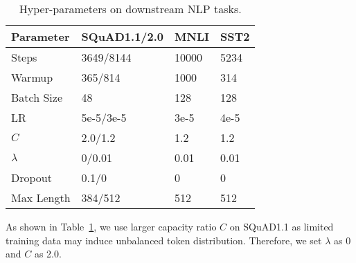 \documentclass[letterpaper]{article} \usepackage{aaai22}  \usepackage{times}  \usepackage{helvet}  \usepackage{courier}  \usepackage[hyphens]{url}  \usepackage{graphicx} \urlstyle{rm} \def\UrlFont{\rm}  \usepackage{natbib}  \usepackage{caption} \DeclareCaptionStyle{ruled}{labelfont=normalfont,labelsep=colon,strut=off} \frenchspacing  \setlength{\pdfpagewidth}{8.5in}  \setlength{\pdfpageheight}{11in}  \usepackage{algorithm}
\begin{document}
\begin{table}[ht]
\centering
\caption{Hyper-parameters on downstream NLP tasks.}
\label{tbl-hyper-parameter-nlp-pretrain}
\begin{tabular}{l|l l l}
\toprule
Parameter                  & SQuAD1.1/2.0 & MNLI & SST2  \\ \midrule
Steps                     & 3649/8144 & 10000 & 5234     \\
Warmup              & 365/814   & 1000 & 314     \\
Batch Size                & 48 & 128 & 128     \\
LR             & 5e-5/3e-5 & 3e-5 & 4e-5  \\
$C$              & 2.0/1.2  & 1.2 & 1.2 \\
$\lambda$                   & 0/0.01  & 0.01 & 0.01  \\ 
Dropout           & 0.1/0   & 0  & 0   \\
Max Length               & 384/512  & 512 & 512  \\
\bottomrule
\end{tabular}
\end{table}

As shown in Table~\ref{tbl-hyper-parameter-nlp-pretrain}, we use larger capacity ratio $C$ on SQuAD1.1 as limited training data may induce unbalanced token distribution. Therefore, we set $\lambda$ as 0 and $C$ as 2.0. 
\end{document}
